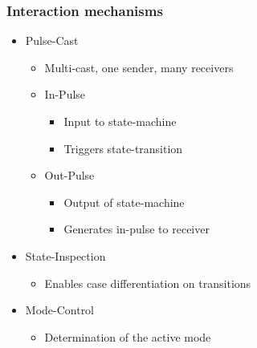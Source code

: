 \hypertarget{interaction-mechanisms}{%
\subsubsection{Interaction mechanisms}\label{interaction-mechanisms}}

\begin{itemize}
\tightlist
\item
  Pulse-Cast

  \begin{itemize}
  \tightlist
  \item
    Multi-cast, one sender, many receivers
  \item
    In-Pulse

    \begin{itemize}
    \tightlist
    \item
      Input to state-machine
    \item
      Triggers state-transition
    \end{itemize}
  \item
    Out-Pulse

    \begin{itemize}
    \tightlist
    \item
      Output of state-machine
    \item
      Generates in-pulse to receiver
    \end{itemize}
  \end{itemize}
\item
  State-Inspection

  \begin{itemize}
  \tightlist
  \item
    Enables case differentiation on transitions
  \end{itemize}
\item
  Mode-Control

  \begin{itemize}
  \tightlist
  \item
    Determination of the active mode
  \end{itemize}
\end{itemize}

\clearpage